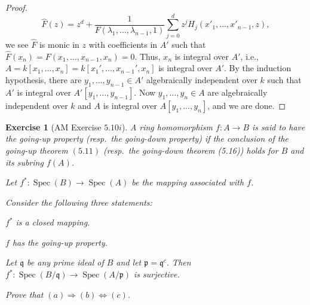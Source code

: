 \documentclass[12pt,letterpaper]{article}
\newtheorem{problem}{Exercise}[section]
\theoremstyle{definition}
\theoremstyle{remark}
\numberwithin{figure}{problem}
\numberwithin{equation}{section}
\DeclareMathOperator{\Spec}{Spec}
\begin{document}
\begin{proof}
  \begin{equation*}
    \hat{F}(z) = z^d + \frac{1}{F(\lambda_1,\ldots,\lambda_{n-1},1)} \sum_{j=0}^d z^jH_j(x'_1,\ldots,x'_{n-1},z),
  \end{equation*}
  we see $\hat{F}$ is monic in $z$ with coefficients in $A'$ such that $\hat{F}(x_n) = F(x_1,\ldots,x_{n-1},x_n) = 0$. Thus, $x_n$ is integral over $A'$, i.e., $A = k[x_1,\ldots,x_n] = k[x_1',\ldots,x_{n-1}',x_n]$ is integral over $A'$. By the induction hypothesis, there are $y_1,\ldots,y_{n-1} \in A'$ algebraically independent over $k$ such that $A'$ is integral over $A'[y_1,\ldots,y_{n-1}]$. Now $y_1,\ldots,y_n \in A$ are algebraically independent over $k$ and $A$ is integral over $A[y_1,\ldots,y_n]$, and we are done.
\end{proof}

\begin{problem}[AM Exercise $5.10i$]
  A ring homomorphism $f : A \to B$ is said to have the \emph{going-up property} \emph{(}resp.~the \emph{going-down property)} if the conclusion of the going-up theorem $(5.11)$ \emph{(}resp.~the \emph{going-down theorem (5.16))} holds for $B$ and its subring $f(A)$.
  \par Let $f^* : \Spec(B) \to \Spec(A)$ be the mapping associated with $f$.
  \par Consider the following three statements:
  \begin{enum}
    \item $f^*$ is a closed mapping.
    \item $f$ has the going-up property.
    \item Let $\mathfrak{q}$ be any prime ideal of $B$ and let $\mathfrak{p} = \mathfrak{q}^c$. Then $f^* : \Spec(B/\mathfrak{q}) \to \Spec(A/\mathfrak{p})$ is surjective.
  \end{enum}
  Prove that $(a) \Rightarrow (b) \Leftrightarrow (c)$.
\end{problem}
\end{document}

